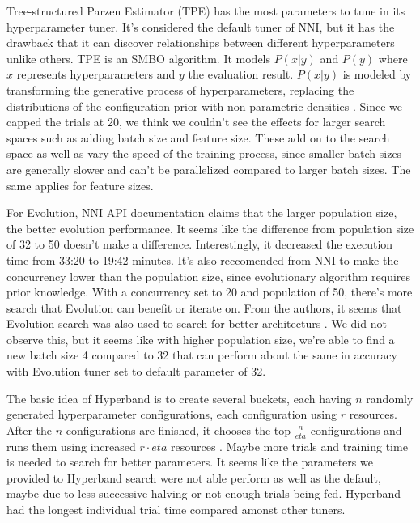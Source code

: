 \documentclass{article}
\begin{document}
Tree-structured Parzen Estimator (TPE) has the most parameters to tune in its hyperparameter tuner. It's considered the default tuner of NNI, but it has the drawback that it can discover relationships between different hyperparameters unlike others. TPE is an SMBO algorithm. It models $P(x|y)$ and $P(y)$ where $x$ represents hyperparameters and $y$ the evaluation result. $P(x|y)$ is modeled by transforming the generative process of hyperparameters, replacing the distributions of the configuration prior with non-parametric densities \cite{tpe}. Since we capped the trials at 20, we think we couldn't see the effects for larger search spaces such as adding batch size and feature size. These add on to the search space as well as vary the speed of the training process, since smaller batch sizes are generally slower and can't be parallelized compared to larger batch sizes. The same applies for feature sizes.

For Evolution, NNI API documentation claims that the larger population size, the better evolution performance. It seems like the difference from population size of 32 to 50 doesn't make a difference. Interestingly, it decreased the execution time from 33:20 to 19:42 minutes.
It's also reccomended from NNI to make the concurrency lower than the population size, since evolutionary algorithm requires prior knowledge. With a concurrency set to 20 and population of 50, there's more search that Evolution can benefit or iterate on. From the authors, it seems that Evolution search was also used to search for better architecturs \cite{evolution}. We did not observe this, but it seems like with higher population size, we're able to find a new batch size 4 compared to 32 that can perform about the same in accuracy with Evolution tuner set to default parameter of 32.

The basic idea of Hyperband is to create several buckets, each having $n$ randomly generated hyperparameter configurations, each configuration using $r$ resources. After the $n$ configurations are finished, it chooses the top $\frac{n}{eta}$ configurations and runs them using increased $r\cdot eta$ resources \cite{hyperband}. Maybe more trials and training time is needed to search for better parameters. It seems like the parameters we provided to Hyperband search were not able perform as well as the default, maybe due to less successive halving or not enough trials being fed. Hyperband had the longest individual trial time compared amonst other tuners.
\end{document}
